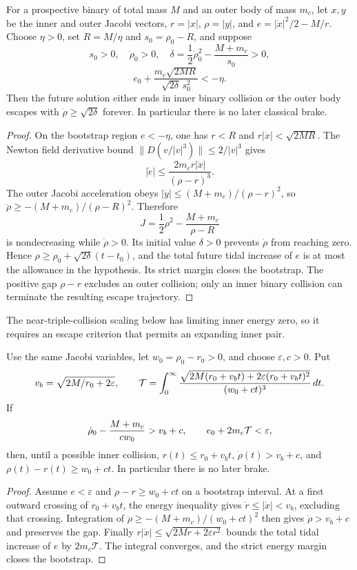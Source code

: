 \begin{lemma}\label{lem:escape}
For a prospective binary of total mass $M$ and an outer body of mass $m_c$,
let $x,y$ be the inner and outer Jacobi vectors, $r=|x|$, $\rho=|y|$, and
$e=|\dot x|^2/2-M/r$. Choose $\eta>0$, set $R=M/\eta$ and
$s_0=\rho_0-R$, and suppose
\[
s_0>0,\quad \dot\rho_0>0,\quad
\delta=\frac12\dot\rho_0^2-\frac{M+m_c}{s_0}>0,
\]
\[
e_0+\frac{m_c\sqrt{2MR}}
{\sqrt{2\delta}\,s_0^2}<-\eta.
\]
Then the future solution either ends in inner binary collision or the outer
body escapes with $\dot\rho\ge\sqrt{2\delta}$ forever. In particular there is
no later classical brake.
\end{lemma}
\begin{proof}
On the bootstrap region $e<-\eta$, one has
$r<R$ and $r|\dot x|<\sqrt{2MR}$. The Newton field derivative bound
$\|D(v/|v|^3)\|\le2/|v|^3$ gives
\[
|\dot e|\le\frac{2m_cr|\dot x|}{(\rho-r)^3}.
\]
The outer Jacobi acceleration obeys
$|\ddot y|\le(M+m_c)/(\rho-r)^2$, so
$\ddot\rho\ge-(M+m_c)/(\rho-R)^2$. Therefore
\[
J=\frac12\dot\rho^2-\frac{M+m_c}{\rho-R}
\]
is nondecreasing while $\dot\rho>0$. Its initial value $\delta>0$
prevents $\dot\rho$ from reaching zero. Hence
$\rho\ge\rho_0+\sqrt{2\delta}(t-t_0)$, and the total future tidal increase of
$e$ is at most the allowance in the hypothesis. Its strict margin closes the
bootstrap. The positive gap $\rho-r$ excludes an outer collision; only an
inner binary collision can terminate the resulting escape trajectory.
\end{proof}

The near-triple-collision scaling below has limiting inner energy zero,
so it requires an escape criterion that permits an expanding inner pair.

\begin{lemma}\label{lem:hierarchical}
Use the same Jacobi variables, let $w_0=\rho_0-r_0>0$, and choose
$\varepsilon,c>0$. Put
\[
 v_b=\sqrt{2M/r_0+2\varepsilon},\qquad
 \mathcal T=\int_0^\infty
 {\sqrt{2M(r_0+v_bt)+2\varepsilon(r_0+v_bt)^2}
  \over(w_0+ct)^3}\,dt.
\]
If
\[
 \dot\rho_0-{M+m_c\over cw_0}>v_b+c,\qquad
 e_0+2m_c\mathcal T<\varepsilon,
\]
then, until a possible inner collision,
$r(t)\le r_0+v_bt$, $\dot\rho(t)>v_b+c$, and
$\rho(t)-r(t)\ge w_0+ct$. In particular there is no later brake.
\end{lemma}
\begin{proof}
Assume $e<\varepsilon$ and $\rho-r\ge w_0+ct$ on a bootstrap interval.
At a first outward crossing of $r_0+v_bt$, the energy inequality gives
$\dot r\le|\dot x|<v_b$, excluding that crossing. Integration of
$\ddot\rho\ge-(M+m_c)/(w_0+ct)^2$ then gives
$\dot\rho>v_b+c$ and preserves the gap. Finally
$r|\dot x|\le\sqrt{2Mr+2\varepsilon r^2}$ bounds the total tidal
increase of $e$ by $2m_c\mathcal T$. The integral converges, and the
strict energy margin closes the bootstrap.
\end{proof}

